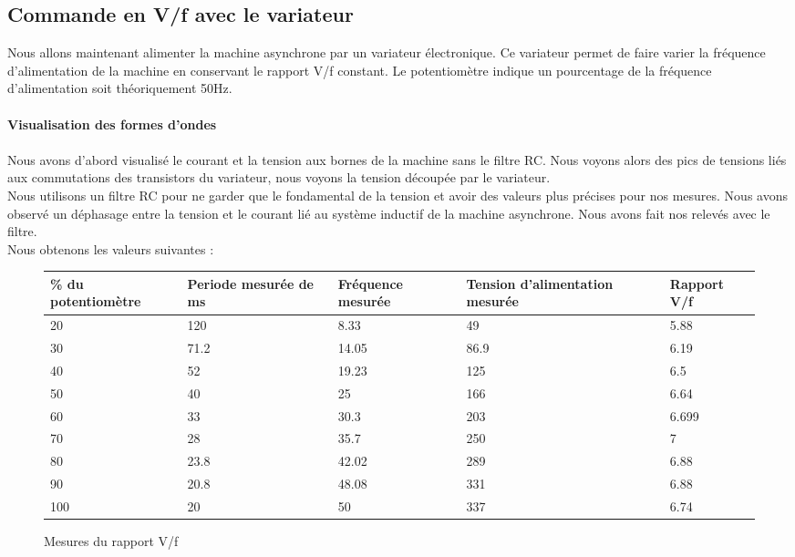 \documentclass[oneside,a4paper,12pt]{article}
\begin{document}
	\subsection{Commande en V/f avec le variateur}
	
	Nous allons maintenant alimenter la machine asynchrone par un variateur électronique. Ce variateur permet de faire varier la fréquence d’alimentation de la machine en conservant le rapport V/f constant. 
	Le potentiomètre indique un pourcentage de la fréquence d'alimentation soit théoriquement 50Hz.\\
	
	\paragraph{Visualisation des formes d'ondes}\paragraph{}
	
	Nous avons d’abord visualisé  le courant et la tension aux bornes de la machine sans le filtre RC. Nous voyons alors des pics de tensions liés aux commutations des transistors du variateur, nous voyons la tension découpée par le variateur.\\
	Nous utilisons un filtre RC pour ne garder que le fondamental de la tension et avoir des valeurs plus précises pour nos mesures. Nous avons observé un déphasage entre la tension et le courant lié au système inductif de la machine asynchrone. Nous avons fait nos relevés avec le filtre.\\
	Nous obtenons les valeurs suivantes : \\
	\begin{figure}[h]
		\begin{center}
			\begin{tabular}{|p{0.2\textwidth}|p{}|p{}|p{}|p{}|}
				\hline
				\% du potentiomètre & Periode mesurée de ms & Fréquence mesurée & Tension d'alimentation mesurée & Rapport V/f\\
				\hline
				\hline
				20 & 120 & 8.33 & 49 & 5.88\\ 
				\hline
				30 & 71.2 & 14.05 & 86.9 & 6.19\\ 
				\hline
				40 & 52 & 19.23 & 125 & 6.5\\ 
				\hline
				50 & 40 & 25 & 166 & 6.64\\ 
				\hline
				60 & 33 & 30.3 & 203 & 6.699\\ 
				\hline
				70 & 28 & 35.7 & 250 & 7\\ 
				\hline
				80 & 23.8 & 42.02 & 289 & 6.88\\ 
				\hline
				90 & 20.8 & 48.08 & 331 & 6.88\\
				\hline
				100 & 20 & 50 & 337 & 6.74\\ 
				\hline
			\end{tabular}
		\end{center}
		\caption{Mesures du rapport V/f}
	\end{figure}
	
\end{document}
